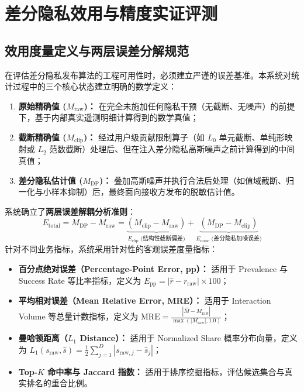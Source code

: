 \section{差分隐私效用与精度实证评测}
\label{sec:utility}

\subsection{效用度量定义与两层误差分解规范}
在评估差分隐私发布算法的工程可用性时，必须建立严谨的误差基准。本系统对统计过程中的三个核心状态建立明确的数学定义：
\begin{enumerate}[label=(\alph*), leftmargin=2.5em]
  \item \textbf{原始精确值 ($M_{\text{raw}}$)：} 在完全未施加任何隐私干预（无截断、无噪声）的前提下，基于内部真实遥测明细计算得到的数学真值；
  \item \textbf{截断精确值 ($M_{\text{clip}}$)：} 经过用户级贡献限制算子（如 $L_0$ 单元截断、单纯形映射或 $L_2$ 范数截断）处理后、但在注入差分隐私高斯噪声之前计算得到的中间真值；
  \item \textbf{差分隐私估计值 ($M_{\text{DP}}$)：} 叠加高斯噪声并执行合法后处理（如值域截断、归一化与小样本抑制）后，最终面向接收方发布的脱敏估计值。
\end{enumerate}

系统确立了\textbf{两层误差解耦分析准则}：
\begin{equation}
  \label{eq:two_tier_decomp}
  E_{\text{total}} = M_{\text{DP}} - M_{\text{raw}} = \underbrace{(M_{\text{clip}} - M_{\text{raw}})}_{E_{\text{clip}}\text{ (结构性截断偏差)}} + \underbrace{(M_{\text{DP}} - M_{\text{clip}})}_{E_{\text{noise}}\text{ (差分隐私加噪误差)}}
\end{equation}
针对不同业务指标，系统采用针对性的客观误差度量指标：
\begin{itemize}[leftmargin=2em]
  \item \textbf{百分点绝对误差（Percentage-Point Error, pp）：} 适用于 Prevalence 与 Success Rate 等比率指标，定义为 $E_{\text{pp}} = |\hat{r} - r_{\text{raw}}| \times 100$；
  \item \textbf{平均相对误差（Mean Relative Error, MRE）：} 适用于 Interaction Volume 等总量计数指标，定义为 $\text{MRE} = \frac{|\hat{M} - M_{\text{raw}}|}{\max(|M_{\text{raw}}|, 1.0)}$；
  \item \textbf{曼哈顿距离（$L_1$ Distance）：} 适用于 Normalized Share 概率分布向量，定义为 $L_1(s_{\text{raw}}, \hat{s}) = \frac{1}{2} \sum_{j=1}^D |s_{\text{raw}, j} - \hat{s}_j|$；
  \item \textbf{Top-$K$ 命中率与 Jaccard 指数：} 适用于排序挖掘指标，评估候选集合与真实排名的重合比例。
\end{itemize}


